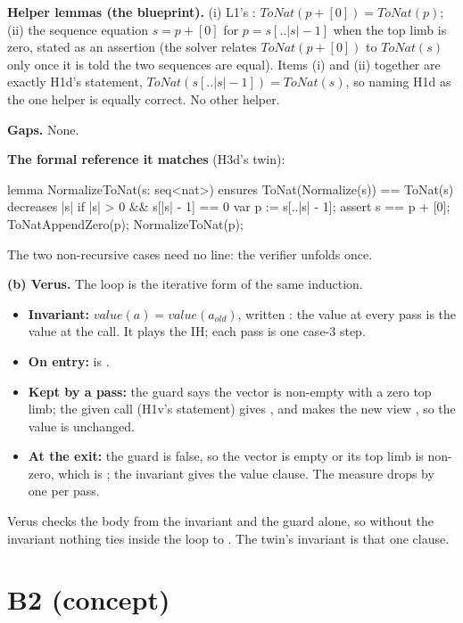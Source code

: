 \documentclass[11pt]{article}
\begin{document}
\textbf{Helper lemmas (the blueprint).} (i) L1's :
$\mathit{ToNat}(p + [0]) = \mathit{ToNat}(p)$; (ii) the sequence equation
$s = p + [0]$ for $p = s[..|s|-1]$ when the top limb is zero, stated as an
assertion (the solver relates $\mathit{ToNat}(p + [0])$ to $\mathit{ToNat}(s)$
only once it is told the two sequences are equal). Items (i) and (ii) together
are exactly H1d's statement, $\mathit{ToNat}(s[..|s|-1]) = \mathit{ToNat}(s)$,
so naming H1d as the one helper is equally correct. No other helper.

\textbf{Gaps.} None.

\textbf{The formal reference it matches} (H3d's twin):
\begin{dafnycode}
lemma NormalizeToNat(s: seq<nat>)
  ensures ToNat(Normalize(s)) == ToNat(s)
  decreases |s|
{
  if |s| > 0 && s[|s| - 1] == 0 {
    var p := s[..|s| - 1];
    assert s == p + [0];
    ToNatAppendZero(p);
    NormalizeToNat(p);
  }
}
\end{dafnycode}
The two non-recursive cases need no line: the verifier unfolds
 once.

\textbf{(b) Verus.} The loop is the iterative form of the same induction.
\begin{itemize}
\item \textbf{Invariant:} $\mathit{value}(a) = \mathit{value}(a_{\mathit{old}})$,
  written : the value at every pass is the
  value at the call. It plays the IH; each pass is one case-3 step.
\item \textbf{On entry:}  is .
\item \textbf{Kept by a pass:} the guard says the vector is non-empty with a zero
  top limb; the given call (H1v's statement) gives
  , and  makes the
  new view , so the value is unchanged.
\item \textbf{At the exit:} the guard is false, so the vector is empty or its top
  limb is non-zero, which is ; the invariant gives the value clause.
  The measure  drops by one per pass.
\end{itemize}
Verus checks the body from the invariant and the guard alone, so without the
invariant nothing ties  inside the loop to . The twin's
invariant is that one clause.

\section*{B2 (concept)}
\end{document}
